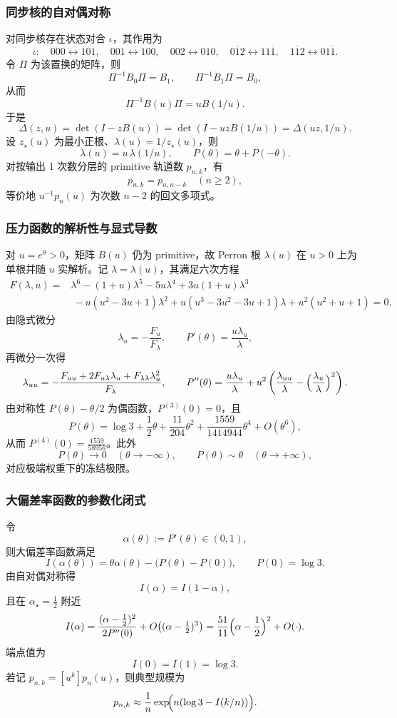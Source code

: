 \subsubsection{同步核的自对偶对称}\label{app:kernel-self-dual}
对同步核存在状态对合 $\iota$，其作用为
\[
\iota:\quad
000\leftrightarrow 101,\quad
001\leftrightarrow 100,\quad
002\leftrightarrow 010,\quad
0\overline{1}2\leftrightarrow 11\overline{1},\quad
1\overline{1}2\leftrightarrow 01\overline{1}.
\]
令 $\Pi$ 为该置换的矩阵，则
\[
\Pi^{-1}B_0\Pi=B_1,\qquad \Pi^{-1}B_1\Pi=B_0,
\]
从而
\[
\Pi^{-1}B(u)\Pi=uB(1/u).
\]
于是
\[
\Delta(z,u)=\det(I-zB(u))=\det(I-uzB(1/u))=\Delta(uz,1/u).
\]
设 $z_\star(u)$ 为最小正根、$\lambda(u)=1/z_\star(u)$，则
\[
\lambda(u)=u\,\lambda(1/u),
\qquad
P(\theta)=\theta+P(-\theta).
\]
对按输出 1 次数分层的 primitive 轨道数 $p_{n,k}$，有
\[
p_{n,k}=p_{n,n-k}\quad(n\ge 2),
\]
等价地 $u^{-1}p_n(u)$ 为次数 $n-2$ 的回文多项式。

\subsubsection{压力函数的解析性与显式导数}\label{app:pressure-analytic}
对 $u=e^\theta>0$，矩阵 $B(u)$ 仍为 primitive，故 Perron 根 $\lambda(u)$ 在 $u>0$ 上为单根并随 $u$ 实解析。记 $\lambda=\lambda(u)$，其满足六次方程
\[
\begin{aligned}
F(\lambda,u)
={}&\lambda^6-(1+u)\lambda^5-5u\lambda^4+3u(1+u)\lambda^3\\
&\ -u(u^2-3u+1)\lambda^2+u(u^3-3u^2-3u+1)\lambda+u^2(u^2+u+1)=0.
\end{aligned}
\]
由隐式微分
\[
\lambda_u=-\frac{F_u}{F_\lambda},\qquad
P'(\theta)=\frac{u\lambda_u}{\lambda},
\]
再微分一次得
\[
\lambda_{uu}=-\frac{F_{uu}+2F_{u\lambda}\lambda_u+F_{\lambda\lambda}\lambda_u^2}{F_\lambda},
\qquad
P''(\theta)=\frac{u\lambda_u}{\lambda}+u^2\left(\frac{\lambda_{uu}}{\lambda}-\Bigl(\frac{\lambda_u}{\lambda}\Bigr)^2\right).
\]
由对称性 $P(\theta)-\theta/2$ 为偶函数，$P^{(3)}(0)=0$，且
\[
P(\theta)=\log 3+\frac12\theta+\frac{11}{204}\theta^2+\frac{1559}{1414944}\theta^4+O(\theta^6),
\]
从而 $P^{(4)}(0)=\frac{1559}{58956}$。此外
\[
P(\theta)\to 0\quad(\theta\to-\infty),\qquad
P(\theta)\sim \theta\quad(\theta\to+\infty),
\]
对应极端权重下的冻结极限。

\subsubsection{大偏差率函数的参数化闭式}\label{app:rate-param}
令
\[
\alpha(\theta):=P'(\theta)\in(0,1),
\]
则大偏差率函数满足
\[
I(\alpha(\theta))=\theta\alpha(\theta)-\bigl(P(\theta)-P(0)\bigr),\qquad P(0)=\log 3.
\]
由自对偶对称得
\[
I(\alpha)=I(1-\alpha),
\]
且在 $\alpha_\star=\frac12$ 附近
\[
I(\alpha)=\frac{(\alpha-\frac12)^2}{2P''(0)}+O\!\left((\alpha-\tfrac12)^3\right)
=\frac{51}{11}\Bigl(\alpha-\frac12\Bigr)^2+O(\cdot).
\]
端点值为
\[
I(0)=I(1)=\log 3.
\]
若记 $p_{n,k}=[u^k]p_n(u)$，则典型规模为
\[
p_{n,k}\approx \frac{1}{n}\exp\!\Bigl(n(\log 3-I(k/n))\Bigr).
\]

